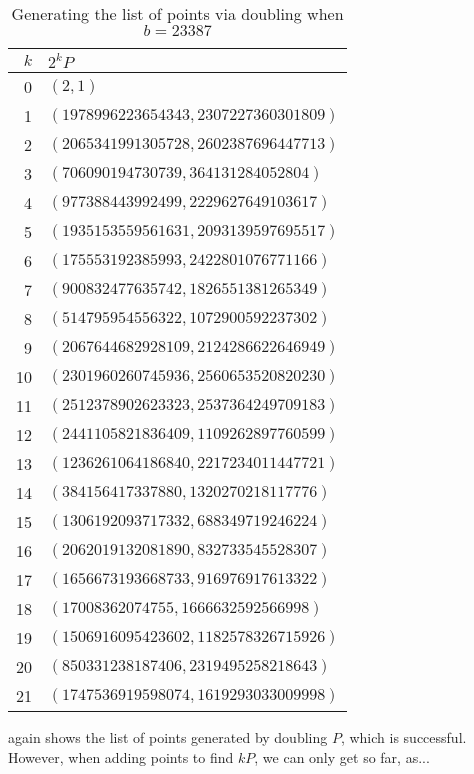 \begin{table}[htbp]
	\centering
	\begin{tabular}{r|l}
		$k$ & $2^k P$\\
		\hline
		0 & $(2, 1)$\\
		1 & $(1978996223654343, 2307227360301809)$\\
		2 & $(2065341991305728, 2602387696447713)$\\
		3 & $(706090194730739, 364131284052804)$\\
		4 & $(977388443992499, 2229627649103617)$\\
		5 & $(1935153559561631, 2093139597695517)$\\
		6 & $(175553192385993, 2422801076771166)$\\
		7 & $(900832477635742, 1826551381265349)$\\
		8 & $(514795954556322, 1072900592237302)$\\
		9 & $(2067644682928109, 2124286622646949)$\\
		10 & $(2301960260745936, 2560653520820230)$\\
		11 & $(2512378902623323, 2537364249709183)$\\
		12 & $(2441105821836409, 1109262897760599)$\\
		13 & $(1236261064186840, 2217234011447721)$\\
		14 & $(384156417337880, 1320270218117776)$\\
		15 & $(1306192093717332, 688349719246224)$\\
		16 & $(2062019132081890, 832733545528307)$\\
		17 & $(1656673193668733, 916976917613322)$\\
		18 & $(17008362074755, 1666632592566998)$\\
		19 & $(1506916095423602, 1182578326715926)$\\
		20 & $(850331238187406, 2319495258218643)$\\
		21 & $(1747536919598074, 1619293033009998)$
	\end{tabular}
	\caption{Generating the list of points via doubling when $b=23387$}
	\label{successfuldouble}
\end{table}
 again shows the list of points generated by doubling $P$, which is successful. However, when adding points to find $kP$, we can only get so far, as...
